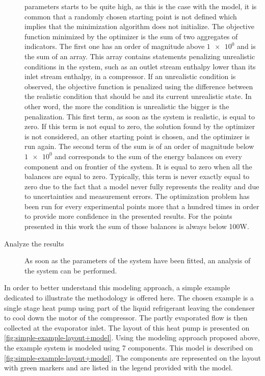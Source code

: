 \begin{description}
  parameters starts to be quite high, as this is the case with the
  \AWP{} model, it is common that a randomly chosen starting point is
  not defined which implies that the minimization algorithm does not
  initialize. The objective function minimized by the optimizer is the
  sum of two aggregates of indicators. The first one has an order of
  magnitude above $\num{1e0}$ and is the sum of an array. This array
  contains statements penalizing unrealistic conditions in the system,
  such as an outlet stream enthalpy lower than its inlet stream
  enthalpy, in a compressor. If an unrealistic condition is observed,
  the objective function is penalized using the difference between the
  realistic condition that should be and its current unrealistic
  state. In other word, the more the condition is unrealistic the
  bigger is the penalization. This first term, as soon as the system
  is realistic, is equal to zero. If this term is not equal to zero,
  the solution found by the optimizer is not considered, an other
  starting point is chosen, and the optimizer is run again. The second
  term of the sum is of an order of magnitude below $\num{1e0}$ and
  corresponds to the sum of the energy balances on every component and
  on frontier of the system. It is equal to zero when all the balances
  are equal to zero. Typically, this term is never exactly equal to
  zero due to the fact that a model never fully represents the reality
  and due to uncertainties and measurement errors. The optimization
  problem has been run for every experimental points more that a
  hundred times in order to provide more confidence in the presented
  results. For the points presented in this work the sum of those
  balances is always below 100W.
\item[Analyze the results] As soon as the parameters of the system
  have been fitted, an analysis of the system can be performed.
\end{description}

In order to better understand this modeling approach, a simple example
dedicated to illustrate the methodology is offered here. The chosen
example is a single stage heat pump using part of the liquid
refrigerant leaving the condenser to cool down the motor of the
compressor. The partly evaporated flow is then collected at the
evaporator inlet. The layout of this heat pump is presented on
\cref{fig:simple-example-layout+model}. Using the modeling approach
proposed above, the example system is modeled using 7 components. This
model is described on \cref{fig:simple-example-layout+model}. The
components are represented on the layout with green markers and are
listed in the legend provided with the model.

